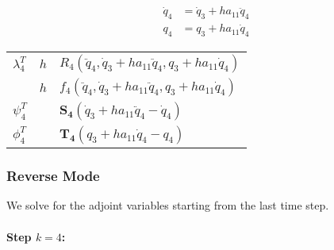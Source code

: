 \documentclass[10pt,letter]{book}
\begin{document}
     \begin{equation}\nonumber
       \begin{split}
         \dot{q}_{4} &= \dot{q}_3 + h a_{11} \ddot{q}_{4}  \\
         q_{4}       &= q_3 + h a_{11} \dot{q}_{4}
       \end{split}
     \end{equation}

     \begin{table}[H]
       \centering
       \begin{tabular}{l | l  |l}
         $\lambda_{4}^T$ & $h$ & $R_4(\ddot{q}_4, \dot{q}_3 + h a_{11} \ddot{q}_{4},
         q_3 + h a_{11} \dot{q}_{4} )$\\
         & $h$ & $f_4(\ddot{q}_4, \dot{q}_3 + h a_{11} \ddot{q}_{4},  q_3 + h a_{11} \dot{q}_{4} )$\\
         $\psi_4^T$ & & $\mathbf{S_4}\left(\dot{q}_3 + h a_{11} \ddot{q}_{4}- \dot{q}_{4} \right)$ \\
         $\phi_4^T$ & & $\mathbf{T_4}\left(q_3 + h a_{11} \dot{q}_{4} - q_{4}\right) $ \\
       \end{tabular}
     \end{table}

     \subsubsection{Reverse Mode}

     We solve for the adjoint variables starting from the last time
     step.

     \paragraph{Step $k=4$:}
\end{document}
